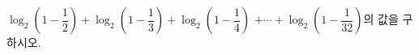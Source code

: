 $\log_2\left(1-\dfrac{1}{2}\right)+\log_2\left(1-\dfrac{1}{3}\right)+\log_2\left(1-\dfrac{1}{4}\right)$ $+\cdots+\log_2\left(1-\dfrac{1}{32}\right)$의 값을 구하시오.
